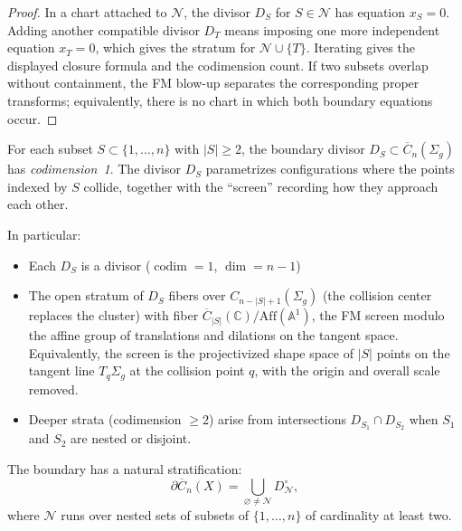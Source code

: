 \begin{proof}
In a chart attached to $\mathcal N$, the divisor $D_S$ for
$S\in\mathcal N$ has equation $x_S=0$. Adding another compatible
divisor $D_T$ means imposing one more independent equation $x_T=0$,
which gives the stratum for $\mathcal N\cup\{T\}$. Iterating gives the
displayed closure formula and the codimension count. If two subsets
overlap without containment, the FM blow-up separates the corresponding
proper transforms; equivalently, there is no chart in which both
boundary equations occur.
\end{proof}

\begin{corollary}\label{cor:dimension-strata}
For each subset $S \subset \{1,\ldots,n\}$ with $|S| \geq 2$, the boundary divisor
$D_S \subset \overline{C}_n(\Sigma_g)$ has \emph{codimension~1}. The divisor $D_S$
parametrizes configurations where the points indexed by $S$ collide, together with
the ``screen'' recording how they approach each other.

In particular:
\begin{itemize}
\item Each $D_S$ is a divisor ($\operatorname{codim} = 1$, $\dim = n-1$)
\item The open stratum of $D_S$ fibers over $C_{n-|S|+1}(\Sigma_g)$ (the collision
center replaces the cluster) with fiber
$\overline{C}_{|S|}(\mathbb{C})\big/\mathrm{Aff}(\mathbb{A}^1)$,
the FM screen modulo the affine group of translations and dilations
on the tangent space. Equivalently, the screen is the projectivized
shape space of $|S|$ points on the tangent line $T_q\Sigma_g$ at the
collision point $q$, with the origin and overall scale removed.
\item Deeper strata (codimension $\geq 2$) arise from intersections
$D_{S_1}\cap D_{S_2}$ when $S_1$ and $S_2$ are nested or disjoint.
\end{itemize}
\end{corollary}

\begin{theorem}
\label{thm:boundary-stratification}
The boundary has a natural stratification:
\[
\partial\overline{C}_n(X)
=
\bigcup_{\varnothing\neq\mathcal N} D_{\mathcal N}^{\circ},
\]
where $\mathcal N$ runs over nested sets of subsets of
$\{1,\ldots,n\}$ of cardinality at least two.
\end{theorem}

